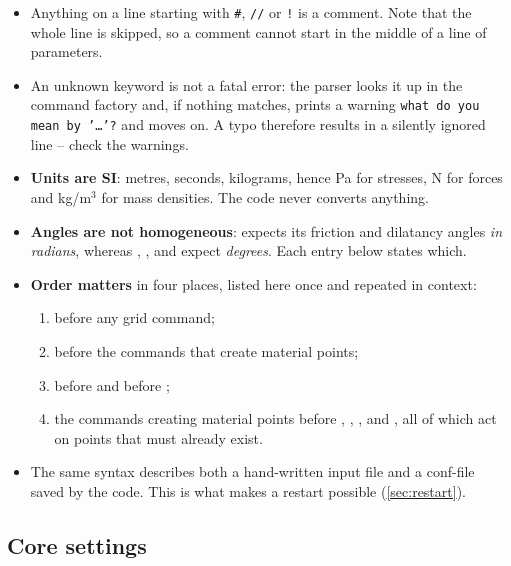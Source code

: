 \documentclass[a4paper,onecolumn,11pt]{doofus}
\begin{document}
\begin{itemize}
\item Anything on a line starting with \texttt{\#}, \texttt{//} or \texttt{!} is a comment.
      Note that the whole line is skipped, so a comment cannot start in the middle of a line
      of parameters.
\item An unknown keyword is not a fatal error: the parser looks it up in the command factory
      and, if nothing matches, prints a warning \texttt{what do you mean by '\dots'?} and moves
      on. A typo therefore results in a silently ignored line -- check the warnings.
\item \textbf{Units are SI}: metres, seconds, kilograms, hence Pa for stresses, N for forces
      and kg/m$^3$ for mass densities. The code never converts anything.
\item \textbf{Angles are not homogeneous}:  expects its friction and
      dilatancy angles \emph{in radians}, whereas ,
      ,  and  expect
      \emph{degrees}. Each entry below states which.
\item \textbf{Order matters} in four places, listed here once and repeated in context:
      \begin{enumerate}
      \item {} before any grid command;
      \item {} before the commands that create material points;
      \item {} before  and before
            ;
      \item the commands creating material points before ,
            , ,
             and , all of which act on
            points that must already exist.
      \end{enumerate}
\item The same syntax describes both a hand-written input file and a conf-file saved by the
      code. This is what makes a restart possible (\cref{sec:restart}).
\end{itemize}

\subsection{Core settings}
\label{sec:core}
\end{document}

